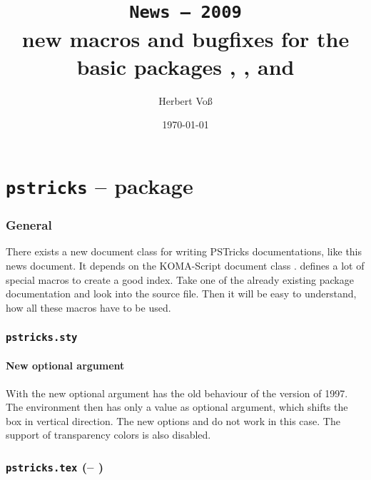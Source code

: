 \documentclass[11pt,english,BCOR10mm,DIV12,bibliography=totoc,parskip=false,smallheadings
    headexclude,footexclude,oneside]{pst-doc}
\begin{document}
\title{\texttt{News -- 2009}\\ \Large new macros and bugfixes for the
basic packages , , and }
\author{Herbert Voß}
\date{\today}

\maketitle

\clearpage
\tableofcontents

\clearpage
\part{\texttt{pstricks} -- package}

\section{General}
There exists a new document class  for writing PSTricks documentations,
like this news document. It depends on the KOMA-Script document class .
 defines a lot of special macros to create a good index. Take one of
the already existing package documentation and look into the source file. Then it will be
easy to understand, how all these macros have to be used.



\section{\texttt{pstricks.sty}}

\subsection{New optional argument}
With the new optional argument   has the old behaviour of the
version of 1997. The  environment then has only a value as
optional argument, which shifts the box in vertical direction. The new options
 and  do not work in this case.
The support of transparency colors is also disabled.


\section{\texttt{pstricks.tex} (\pstricksFV -- \pstricksFD)}
\end{document}
